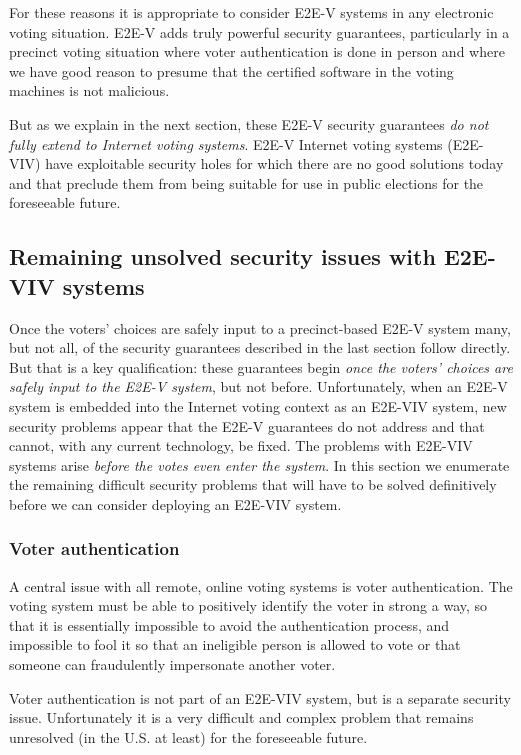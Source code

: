 For these reasons it is appropriate to consider E2E-V systems in any
electronic voting situation. E2E-V adds truly powerful security
guarantees, particularly in a precinct voting situation where voter
authentication is done in person and where we have good reason to
presume that the certified software in the voting machines is not
malicious.

But as we explain in the next section, these E2E-V security guarantees
\emph{do not fully extend to Internet voting systems}. E2E-V Internet
voting systems (E2E-VIV) have exploitable security holes for which
there are no good solutions today and that preclude them from being
suitable for use in public elections for the foreseeable future.
  
\subsection{Remaining unsolved security issues with E2E-VIV systems}

Once the voters' choices are safely input to a precinct-based E2E-V
system many, but not all, of the security guarantees described in the
last section follow directly. But that is a key qualification: these
guarantees begin \emph{once the voters' choices are safely input to
  the E2E-V system}, but not before. Unfortunately, when an E2E-V
system is embedded into the Internet voting context as an E2E-VIV
system, new security problems appear that the E2E-V guarantees do not
address and that cannot, with any current technology, be fixed. The
problems with E2E-VIV systems arise \emph{before the votes even enter
  the system}. In this section we enumerate the remaining difficult
security problems that will have to be solved definitively before we
can consider deploying an E2E-VIV system.


\subsubsection{Voter authentication}

A central issue with all remote, online voting systems is voter
authentication. The voting system must be able to positively identify
the voter in strong a way, so that it is essentially impossible to
avoid the authentication process, and impossible to fool it so that an
ineligible person is allowed to vote or that someone can fraudulently
impersonate another voter.

Voter authentication is not part of an E2E-VIV system, but is a
separate security issue. Unfortunately it is a very difficult and
complex problem that remains unresolved (in the U.S. at least) for the
foreseeable future.

